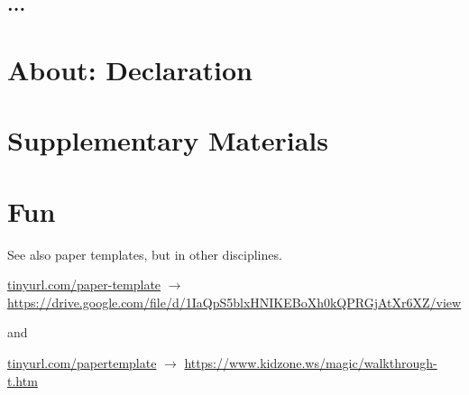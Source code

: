 \documentclass[manuscript, nonacm]{acmart}
\begin{document}
\subsection{...}

% 






\section{About: Declaration}








\newpage

\appendix

\section{Supplementary Materials}
\label{appendix:supplementarymaterials}








\section{Fun}

See also paper templates, but in other disciplines.

\url{tinyurl.com/paper-template}
$\rightarrow$ 
\url{https://drive.google.com/file/d/1IaQpS5blxHNIKEBoXh0kQPRGjAtXr6XZ/view}

and

\url{tinyurl.com/papertemplate}
$\rightarrow$ 
\url{https://www.kidzone.ws/magic/walkthrough-t.htm}
\end{document}
